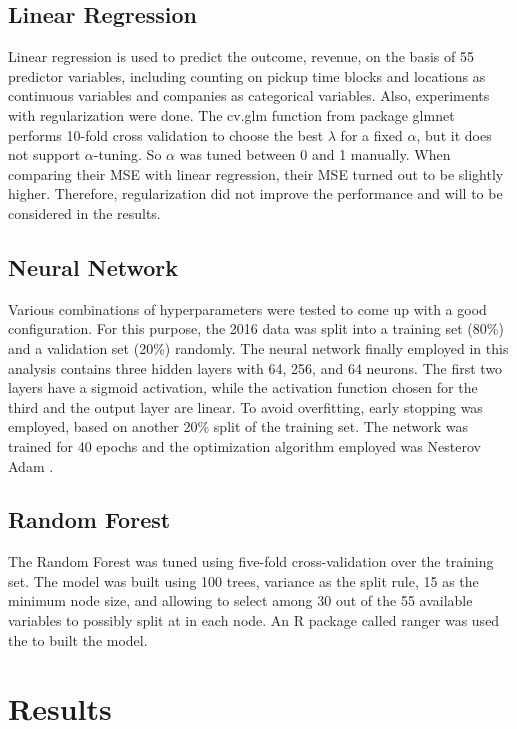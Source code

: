 \documentclass[twoside,11pt]{article}
\begin{document}
\subsection{Linear Regression}

Linear regression is used to predict the outcome, revenue, on the basis of 55 predictor variables, including counting on pickup time blocks and locations as continuous variables and companies as categorical variables. Also, experiments with regularization were done. The cv.glm function from package glmnet performs 10-fold cross validation to choose the best $\lambda$ for a fixed $\alpha$, but it does not support $\alpha$-tuning. So $\alpha$ was tuned between 0 and 1 manually. When comparing their MSE with linear regression, their MSE turned out to be slightly higher. Therefore, regularization did not improve the performance and will to be considered in the results.

\subsection{Neural Network}

Various combinations of hyperparameters were tested to come up with a good configuration. For this purpose, the 2016 data was split into a training set (80\%) and a validation set (20\%) randomly. The neural network finally employed in this analysis contains three hidden layers with 64, 256, and 64 neurons. The first two layers have a sigmoid activation, while the activation function chosen for the third and the output layer are linear. To avoid overfitting, early stopping was employed, based on another 20\% split of the training set. The network was trained for 40 epochs and the optimization algorithm employed was Nesterov Adam \citep{Nadam}.

\subsection{Random Forest}

The Random Forest was tuned using five-fold cross-validation over the training set. The model was built using 100 trees, variance as the split rule, 15 as the minimum node size, and allowing to select among 30 out of the 55 available variables to possibly split at in each node. An  R package called ranger was used the to built the model.

\section{Results} \label{results}
\end{document}

